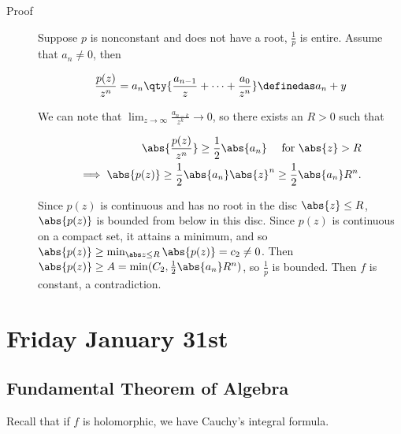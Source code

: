 \begin{description}
\item[Proof]
Suppose \(p\) is nonconstant and does not have a root, \(\frac 1 p\) is
entire. Assume that \(a_n \neq 0\), then

\begin{align*}
\frac{p(z)}{z^n} = a_n \qty{ \frac{a_{n-1}}{z} + \cdots + \frac{a_0}{z^n}  } \definedas a_n + y
\end{align*}

We can note that \(\lim_{z\to \infty} \frac{a_{n-k}}{z^k} \to 0\), so
there exists an \(R>0\) such that

\begin{align*}
\abs{ \frac{p(z)}{z^n}  } \geq \frac 1 2 \abs{a_n} \quad \text{ for } \abs{z} > R \\
\implies \abs{p(z)} \geq \frac 1 2 \abs{a_n} \abs{z}^n \geq \frac 1 2 \abs{a_n} R^n
.\end{align*}

Since \(p(z)\) is continuous and has no root in the disc
\(\abs{z} \leq R\), \(\abs{p(z)}\) is bounded from below in this disc.
Since \(p(z)\) is continuous on a compact set, it attains a minimum, and
so \(\abs{p(z)} \geq \min_{\abs z \leq R} \abs{p(z)} = c_2 \neq 0\).
Then \(\abs{p(z)} \geq A = \min(C_2, \frac 1 2 \abs{a_n}R^n)\), so
\(\frac{1}{p}\) is bounded. Then \(f\) is constant, a contradiction.
\end{description}

\hypertarget{friday-january-31st}{%
\section{Friday January 31st}\label{friday-january-31st}}

\hypertarget{fundamental-theorem-of-algebra}{%
\subsection{Fundamental Theorem of
Algebra}\label{fundamental-theorem-of-algebra}}

Recall that if \(f\) is holomorphic, we have Cauchy's integral formula.

